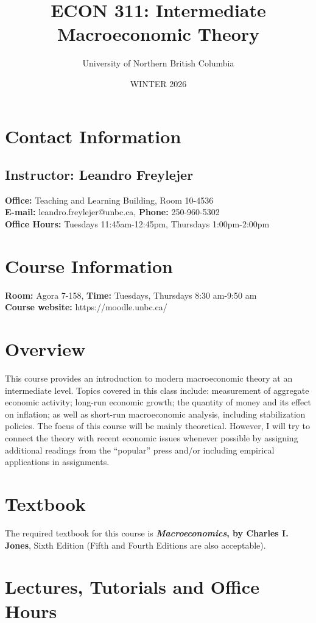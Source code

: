 \documentclass[letterpaper,12pt]{article}
\title{\vspace{-2.4cm}ECON 311: Intermediate Macroeconomic Theory}
\author{University of Northern British Columbia}
\date{WINTER 2026}
\theoremstyle{dotlessS}
\begin{document}
\maketitle
\vspace{-1cm}
\noindent\makebox[\linewidth]{\rule{\textwidth}{1.5pt}}

\section{Contact Information}
\subsection*{Instructor: Leandro Freylejer}
\textbf{Office:} Teaching and Learning Building, Room 10-4536\\
\textbf{E-mail:} leandro.freylejer@unbc.ca, \textbf{Phone:} 250-960-5302 \\
\textbf{Office Hours:} Tuesdays 11:45am-12:45pm, Thursdays 1:00pm-2:00pm
\section{Course Information}
\textbf{Room:} Agora 7-158, \textbf{Time:} Tuesdays, Thursdays 8:30 am-9:50 am \\
\textbf{Course website:} https://moodle.unbc.ca/


\section{Overview}
This course provides an introduction to modern macroeconomic theory at an intermediate level. Topics covered in this class include: measurement of aggregate economic activity; long-run economic growth; the quantity of money and its effect on inflation; as well as short-run macroeconomic analysis, including stabilization policies. The focus of this course will be mainly theoretical. However, I will try to connect the theory with recent economic issues whenever possible by assigning additional readings from the ``popular'' press and/or including empirical applications in assignments.    

\section{Textbook}
The required textbook for this course is \textbf{\textit{Macroeconomics}, by Charles I. Jones}, Sixth Edition (Fifth and Fourth Editions are also acceptable).  
\section{Lectures, Tutorials and Office Hours}
\end{document}
